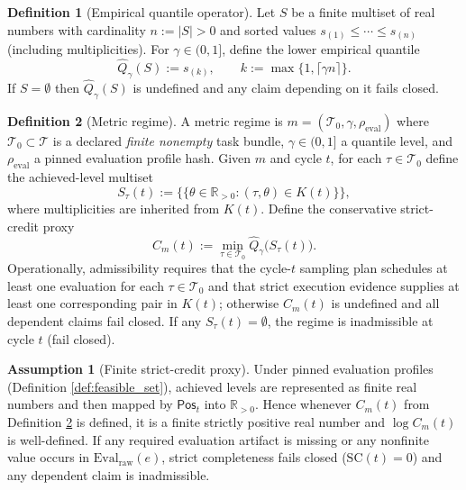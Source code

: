 \documentclass[11pt,a4paper]{article}
\newcommand{\R}{\mathbb{R}}
\newcommand{\EmpQ}{\widehat Q}
\newcommand{\mset}[1]{\{\!\{#1\}\!\}} %
\newcommand{\cT}{\mathcal{T}}
\theoremstyle{definition}
\newtheorem{definition}{Definition}
\newtheorem{assumption}{Assumption}
\theoremstyle{remark}
\begin{document}
\begin{definition}[Empirical quantile operator]\label{def:empirical_quantile_operator}
Let $S$ be a finite multiset of real numbers with cardinality $n:=|S|>0$ and sorted values
$s_{(1)}\le \cdots\le s_{(n)}$ (including multiplicities).
For $\gamma\in(0,1]$, define the lower empirical quantile
\[
\EmpQ_\gamma(S):=s_{(k)},\qquad k:=\max\{1,\lceil \gamma n\rceil\}.
\]
If $S=\emptyset$ then $\EmpQ_\gamma(S)$ is undefined and any claim depending on it fails closed.
\end{definition}

\begin{definition}[Metric regime]\label{def:metric_regime}
A metric regime is $m=(\cT_0,\gamma,\rho_{\mathrm{eval}})$ where $\cT_0\subset\cT$ is a declared \emph{finite nonempty} task bundle, $\gamma\in(0,1]$ a quantile level, and $\rho_{\mathrm{eval}}$ a pinned evaluation profile hash.
Given $m$ and cycle $t$, for each $\tau\in\cT_0$ define the achieved-level multiset
\[
S_\tau(t):=\mset{\theta\in\R_{>0}:(\tau,\theta)\in K(t)},
\]
where multiplicities are inherited from $K(t)$.
Define the conservative strict-credit proxy
\[
C_m(t):=\min_{\tau\in\cT_0}\EmpQ_\gamma\big(S_\tau(t)\big).
\]
Operationally, admissibility requires that the cycle-$t$ sampling plan schedules at least one evaluation for each $\tau\in\cT_0$ and that strict execution evidence supplies at least one corresponding pair in $K(t)$; otherwise $C_m(t)$ is undefined and all dependent claims fail closed.
If any $S_\tau(t)=\emptyset$, the regime is inadmissible at cycle $t$ (fail closed).
\end{definition}

\begin{assumption}[Finite strict-credit proxy]\label{ass:creditbounds}
Under pinned evaluation profiles (Definition \ref{def:feasible_set}), achieved levels are represented as finite real numbers and then mapped by $\mathsf{Pos}_t$ into $\R_{>0}$.
Hence whenever $C_m(t)$ from Definition \ref{def:metric_regime} is defined, it is a finite strictly positive real number and $\log C_m(t)$ is well-defined.
If any required evaluation artifact is missing or any nonfinite value occurs in $\mathrm{Eval}_{\mathrm{raw}}(e)$, strict completeness fails closed ($\mathrm{SC}(t)=0$) and any dependent claim is inadmissible.
\end{assumption}
\end{document}
